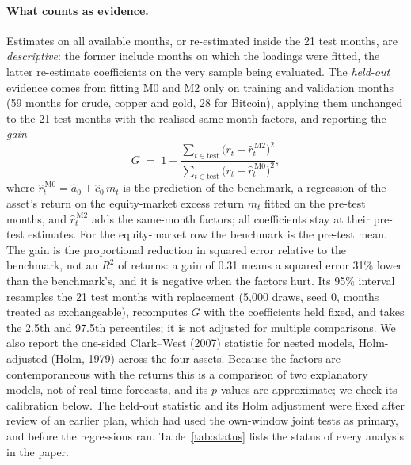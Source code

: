 \documentclass[11pt]{article}
\begin{document}
\paragraph{What counts as evidence.} Estimates on all available months, or re-estimated inside the 21 test months, are \emph{descriptive}: the former include months on which the loadings were fitted, the latter re-estimate coefficients on the very sample being evaluated. The \emph{held-out} evidence comes from fitting M0 and M2 only on training and validation months (59 months for crude, copper and gold, 28 for Bitcoin), applying them unchanged to the 21 test months with the realised same-month factors, and reporting the \emph{gain}
\[
G \;=\; 1-\frac{\sum_{t\in\text{test}}\bigl(r_t-\hat r^{\,\mathrm{M2}}_t\bigr)^2}{\sum_{t\in\text{test}}\bigl(r_t-\hat r^{\,\mathrm{M0}}_t\bigr)^2},
\]
where $\hat r^{\,\mathrm{M0}}_t=\hat a_0+\hat c_0\,m_t$ is the prediction of the benchmark, a regression of the asset's return on the equity-market excess return $m_t$ fitted on the pre-test months, and $\hat r^{\,\mathrm{M2}}_t$ adds the same-month factors; all coefficients stay at their pre-test estimates. For the equity-market row the benchmark is the pre-test mean. The gain is the proportional reduction in squared error relative to the benchmark, not an $R^2$ of returns: a gain of 0.31 means a squared error 31\% lower than the benchmark's, and it is negative when the factors hurt. Its 95\% interval resamples the 21 test months with replacement (5{,}000 draws, seed 0, months treated as exchangeable), recomputes $G$ with the coefficients held fixed, and takes the 2.5th and 97.5th percentiles; it is not adjusted for multiple comparisons. We also report the one-sided Clark--West (2007) statistic for nested models, Holm-adjusted (Holm, 1979) across the four assets. Because the factors are contemporaneous with the returns this is a comparison of two explanatory models, not of real-time forecasts, and its $p$-values are approximate; we check its calibration below. The held-out statistic and its Holm adjustment were fixed after review of an earlier plan, which had used the own-window joint tests as primary, and before the regressions ran. Table~\ref{tab:status} lists the status of every analysis in the paper.
\end{document}
